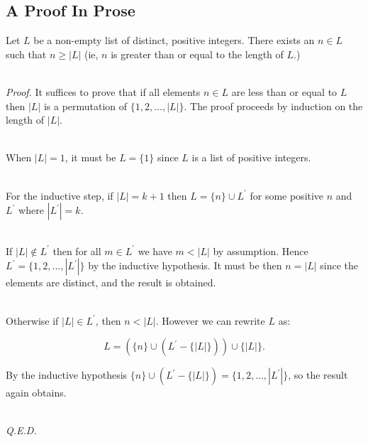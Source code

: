 \documentclass{beamer}
\begin{document}
\subsection{A Proof In Prose}
\begin{frame}{\insertsubsectionhead}

\begin{theorem}
  Let \(L\) be a non-empty list of distinct, positive integers.  There
  exists an \(n \in L\) such that \(n\geq \left|L\right|\) (ie, \(n\)
  is greater than or equal to the length of \(L\).) \\~\
\end{theorem}

\emph{Proof.} It suffices to prove that if all elements \(n \in L\)
are less than or equal to \(L\) then \(|L|\) is a permutation of
\(\{1,2,\ldots,\left|L\right|\}\).  The proof proceeds by induction on
the length of \(|L|\). \\~\

When \(\left|L\right| = 1\), it must be \(L=\{1\}\) since \(L\) is a
list of positive integers. \\~\

\framebreak

For the inductive step, if \(|L| = k + 1\) then
\(L = \{n\} \cup L^\prime\) for some positive \(n\) and \(L^\prime\)
where \(|L^\prime| = k\). \\~\


If \(|L| \not\in L^\prime\) then for all \(m \in L^\prime\) we have
\(m <|L|\) by assumption. Hence
\(L^\prime = \{1,2,\ldots, |L^\prime|\}\) by the inductive
hypothesis. It must be then \(n = |L|\) since the elements are
distinct, and the result is obtained.\\~\

Otherwise if \(|L| \in L^\prime\), then \(n <|L|\).  However we can
rewrite \(L\) as:

\[L = (\{n\} \cup (L^\prime - \{|L|\})) \cup \{|L|\}. \]

By the inductive hypothesis
\(\{n\} \cup (L^\prime - \{|L|\}) = \{1,2,\ldots, |L^\prime|\}\), so
the result again obtains.\\~\

\emph{Q.E.D.}
\end{frame}
\end{document}
